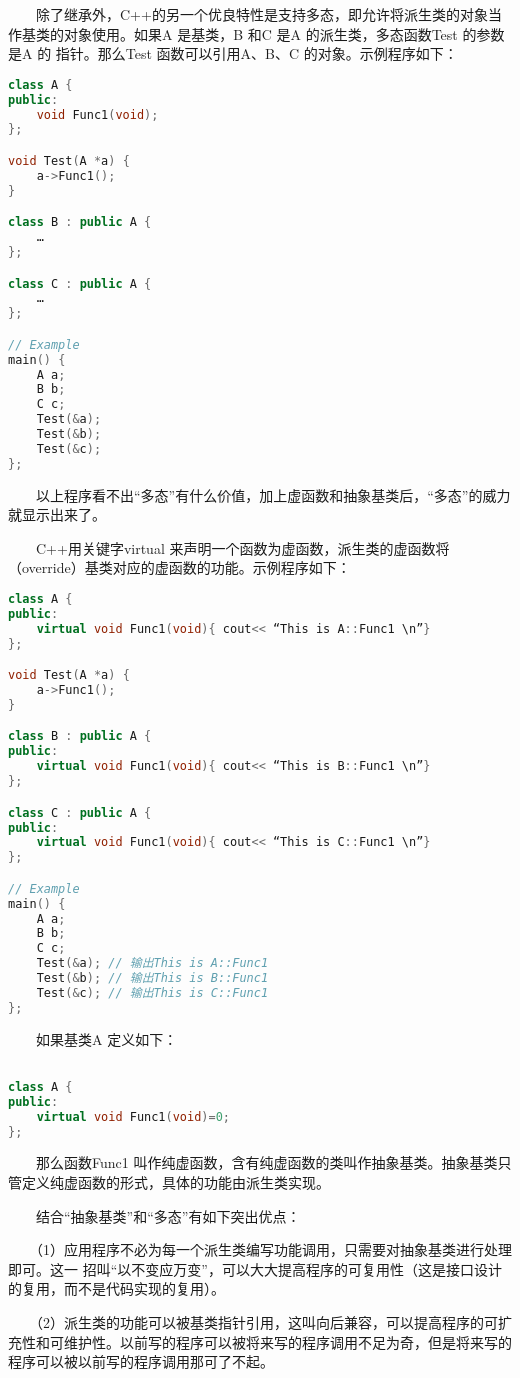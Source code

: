\documentclass[11pt]{article}
\begin{document}
　　除了继承外，C++的另一个优良特性是支持多态，即允许将派生类的对象当作基类的对象使用。如果A 是基类，B 和C 是A 的派生类，多态函数Test 的参数是A 的 指针。那么Test 函数可以引用A、B、C 的对象。示例程序如下：
\begin{lstlisting}[language=c++]
class A {
public:
    void Func1(void);
};

void Test(A *a) {
    a->Func1();
}

class B : public A {
    …
};

class C : public A {
    …
};

// Example
main() {
    A a;
    B b;
    C c;
    Test(&a);
    Test(&b);
    Test(&c);
};
\end{lstlisting}

　　以上程序看不出“多态”有什么价值，加上虚函数和抽象基类后，“多态”的威力就显示出来了。

　　C++用关键字virtual 来声明一个函数为虚函数，派生类的虚函数将（override）基类对应的虚函数的功能。示例程序如下：
\begin{lstlisting}[language=c++]
class A {
public:
    virtual void Func1(void){ cout<< “This is A::Func1 \n”}
};

void Test(A *a) {
    a->Func1();
}

class B : public A {
public:
    virtual void Func1(void){ cout<< “This is B::Func1 \n”}
};

class C : public A {
public:
    virtual void Func1(void){ cout<< “This is C::Func1 \n”}
};

// Example
main() {
    A a;
    B b;
    C c;
    Test(&a); // 输出This is A::Func1
    Test(&b); // 输出This is B::Func1
    Test(&c); // 输出This is C::Func1
};
\end{lstlisting}

　　如果基类A 定义如下：
\begin{lstlisting}[language=c++]

class A {
public:
    virtual void Func1(void)=0;
};
\end{lstlisting}

　　那么函数Func1 叫作纯虚函数，含有纯虚函数的类叫作抽象基类。抽象基类只管定义纯虚函数的形式，具体的功能由派生类实现。

　　结合“抽象基类”和“多态”有如下突出优点：

　　（1）应用程序不必为每一个派生类编写功能调用，只需要对抽象基类进行处理即可。这一
招叫“以不变应万变”，可以大大提高程序的可复用性（这是接口设计的复用，而不是代码实现的复用）。

　　（2）派生类的功能可以被基类指针引用，这叫向后兼容，可以提高程序的可扩充性和可维护性。以前写的程序可以被将来写的程序调用不足为奇，但是将来写的程序可以被以前写的程序调用那可了不起。
\end{document}
